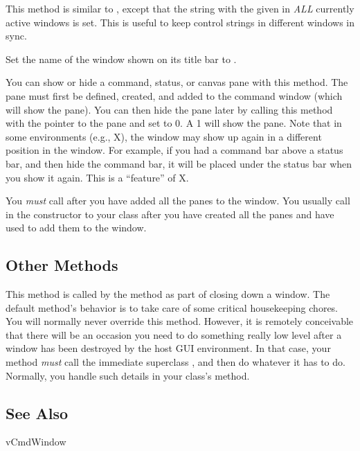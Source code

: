 
This method is similar to , except that
the string with the given  in \emph{ALL} currently
active windows is set. This is useful to keep control strings
in different windows in sync.


Set the name of the window shown on its title bar to .


You can show or hide a command, status, or canvas pane with this
method. The pane must first be defined, created, and added
to the command window (which will show the pane). You can then
hide the pane later by calling this method with the pointer to
the pane and  set to 0. A 1 will show the pane.
Note that in some environments (e.g., X), the window may show up
again in a different position in the window. For example, if you
had a command bar above a status bar, and then hide the command
bar, it will be placed under the status bar when you show it
again. This is a ``feature'' of X.


You \emph{must} call  after you have added all the
panes to the window. You usually call  in the
constructor to your  class after you have created
all the panes and have used  to add them to the window.

\subsection* {Other Methods} %


This method is called by the  method
as part of closing down a window. The default 
method's behavior is to take care of some critical housekeeping
chores. You will normally never override this method. However, it
is remotely conceivable that there will be an occasion you need
to do something really low level after a window has been
destroyed by the host GUI environment. In that case, your method
\emph{must} call the immediate superclass , and
then do whatever it has to do. Normally, you handle such details
in your class's  method.

\subsection* {See Also}

vCmdWindow
